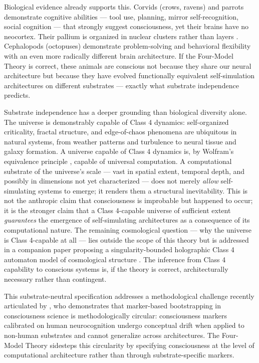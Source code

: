 \documentclass[12pt]{article}
\begin{document}
Biological evidence already supports this. Corvids (crows, ravens) and parrots demonstrate cognitive abilities --- tool use, planning, mirror self-recognition, social cognition --- that strongly suggest consciousness, yet their brains have no neocortex. Their pallium is organized in nuclear clusters rather than layers \citep{Gunturkun2016}. Cephalopods (octopuses) demonstrate problem-solving and behavioral flexibility with an even more radically different brain architecture. If the Four-Model Theory is correct, these animals are conscious not because they share our neural architecture but because they have evolved functionally equivalent self-simulation architectures on different substrates --- exactly what substrate independence predicts.

Substrate independence has a deeper grounding than biological diversity alone. The universe is demonstrably capable of Class 4 dynamics: self-organized criticality, fractal structure, and edge-of-chaos phenomena are ubiquitous in natural systems, from weather patterns and turbulence to neural tissue and galaxy formation. A universe capable of Class 4 dynamics is, by Wolfram's equivalence principle \citep{Wolfram2002}, capable of universal computation. A computational substrate of the universe's scale --- vast in spatial extent, temporal depth, and possibly in dimensions not yet characterized --- does not merely \emph{allow} self-simulating systems to emerge; it renders them a structural inevitability. This is not the anthropic claim that consciousness is improbable but happened to occur; it is the stronger claim that a Class 4-capable universe of sufficient extent \emph{guarantees} the emergence of self-simulating architectures as a consequence of its computational nature. The remaining cosmological question --- why the universe is Class 4-capable at all --- lies outside the scope of this theory but is addressed in a companion paper proposing a singularity-bounded holographic Class 4 automaton model of cosmological structure \citep{Gruber2026c}. The inference from Class 4 capability to conscious systems is, if the theory is correct, architecturally necessary rather than contingent.

This substrate-neutral specification addresses a methodological challenge recently articulated by \citet{Beni2026}, who demonstrates that marker-based bootstrapping in consciousness science is methodologically circular: consciousness markers calibrated on human neurocognition undergo conceptual drift when applied to non-human substrates and cannot generalize across architectures. The Four-Model Theory sidesteps this circularity by specifying consciousness at the level of computational architecture rather than through substrate-specific markers.
\end{document}
